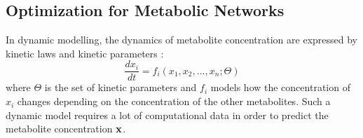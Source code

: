 \subsection{Optimization for Metabolic Networks} \label{section:optimization_gems}
In dynamic modelling, the dynamics of metabolite concentration are expressed by kinetic laws and kinetic parameters \cite{intro_computational_systems_biology}: 
\begin{equation} \label{Eq:dynamic_model}
    \frac{dx_i}{dt} = f_i(x_1, x_2, ..., x_n; \Theta)
\end{equation}
\quad where $\Theta$ is the set of kinetic parameters and $f_i$ models how the concentration of $x_i$ changes depending on the concentration of the other metabolites. Such a dynamic model requires a lot of computational data in order to predict the metabolite concentration $\bold x$.

